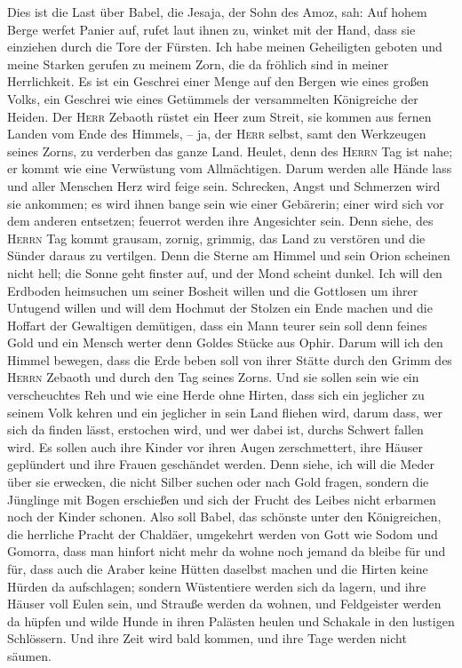  Dies ist die Last über Babel, die Jesaja, der Sohn des
Amoz, sah:  Auf hohem Berge werfet Panier auf, rufet laut
ihnen zu, winket mit der Hand, dass sie einziehen durch die Tore der
Fürsten.  Ich habe meinen Geheiligten geboten und meine
Starken gerufen zu meinem Zorn, die da fröhlich sind in meiner
Herrlichkeit.  Es ist ein Geschrei einer Menge auf den
Bergen wie eines großen Volks, ein Geschrei wie eines Getümmels der
versammelten Königreiche der Heiden. Der \textsc{Herr} Zebaoth rüstet
ein Heer zum Streit,  sie kommen aus fernen Landen vom
Ende des Himmels, -- ja, der \textsc{Herr} selbst, samt den Werkzeugen
seines Zorns, zu verderben das ganze Land.  Heulet, denn
des \textsc{Herrn} Tag ist nahe; er kommt wie eine Verwüstung vom
Allmächtigen.  Darum werden alle Hände lass und aller
Menschen Herz wird feige sein.  Schrecken, Angst und
Schmerzen wird sie ankommen; es wird ihnen bange sein wie einer
Gebärerin; einer wird sich vor dem anderen entsetzen; feuerrot werden
ihre Angesichter sein.  Denn siehe, des \textsc{Herrn} Tag
kommt grausam, zornig, grimmig, das Land zu verstören und die Sünder
daraus zu vertilgen.  Denn die Sterne am Himmel und sein
Orion scheinen nicht hell; die Sonne geht finster auf, und der Mond
scheint dunkel.  Ich will den Erdboden heimsuchen um
seiner Bosheit willen und die Gottlosen um ihrer Untugend willen und
will dem Hochmut der Stolzen ein Ende machen und die Hoffart der
Gewaltigen demütigen,  dass ein Mann teurer sein soll
denn feines Gold und ein Mensch werter denn Goldes Stücke aus Ophir.
 Darum will ich den Himmel bewegen, dass die Erde beben
soll von ihrer Stätte durch den Grimm des \textsc{Herrn} Zebaoth und
durch den Tag seines Zorns.  Und sie sollen sein wie ein
verscheuchtes Reh und wie eine Herde ohne Hirten, dass sich ein
jeglicher zu seinem Volk kehren und ein jeglicher in sein Land fliehen
wird,  darum dass, wer sich da finden lässt, erstochen
wird, und wer dabei ist, durchs Schwert fallen wird.  Es
sollen auch ihre Kinder vor ihren Augen zerschmettert, ihre Häuser
geplündert und ihre Frauen geschändet werden.  Denn
siehe, ich will die Meder über sie erwecken, die nicht Silber suchen
oder nach Gold fragen,  sondern die Jünglinge mit Bogen
erschießen und sich der Frucht des Leibes nicht erbarmen noch der Kinder
schonen.  Also soll Babel, das schönste unter den
Königreichen, die herrliche Pracht der Chaldäer, umgekehrt werden von
Gott wie Sodom und Gomorra,  dass man hinfort nicht mehr
da wohne noch jemand da bleibe für und für, dass auch die Araber keine
Hütten daselbst machen und die Hirten keine Hürden da aufschlagen;
 sondern Wüstentiere werden sich da lagern, und ihre
Häuser voll Eulen sein, und Strauße werden da wohnen, und Feldgeister
werden da hüpfen  und wilde Hunde in ihren Palästen
heulen und Schakale in den lustigen Schlössern. Und ihre Zeit wird bald
kommen, und ihre Tage werden nicht säumen.

